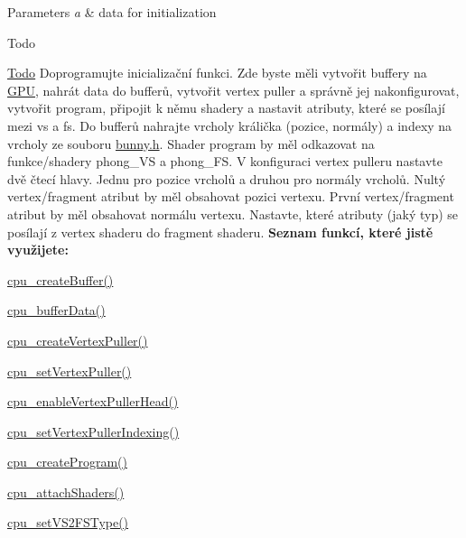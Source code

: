 \begin{DoxyParams}{Parameters}
{\em a} & data for initialization \\
\hline
\end{DoxyParams}
\begin{DoxyRefDesc}{Todo}
\item[\hyperlink{todo__todo000004}{Todo}]Doprogramujte inicializační funkci. Zde byste měli vytvořit buffery na \hyperlink{structGPU}{G\+PU}, nahrát data do bufferů, vytvořit vertex puller a správně jej nakonfigurovat, vytvořit program, připojit k němu shadery a nastavit atributy, které se posílají mezi vs a fs. Do bufferů nahrajte vrcholy králička (pozice, normály) a indexy na vrcholy ze souboru \hyperlink{bunny_8h}{bunny.\+h}. Shader program by měl odkazovat na funkce/shadery phong\+\_\+\+VS a phong\+\_\+\+FS. V konfiguraci vertex pulleru nastavte dvě čtecí hlavy. Jednu pro pozice vrcholů a druhou pro normály vrcholů. Nultý vertex/fragment atribut by měl obsahovat pozici vertexu. První vertex/fragment atribut by měl obsahovat normálu vertexu. Nastavte, které atributy (jaký typ) se posílají z vertex shaderu do fragment shaderu. {\bfseries Seznam funkcí, které jistě využijete\+:}
\begin{DoxyItemize}
\item \hyperlink{cpu_8c_a94245836b857a36f392bf86087e8e776}{cpu\+\_\+create\+Buffer()}
\item \hyperlink{cpu_8c_aee5c818b862ef2e411f121fbdfb1c634}{cpu\+\_\+buffer\+Data()}
\item \hyperlink{cpu_8c_a3ec68476772605b8be33329f88ae4d97}{cpu\+\_\+create\+Vertex\+Puller()}
\item \hyperlink{cpu_8c_a4cb243dfeb6443e0f9a6110ce1dd27eb}{cpu\+\_\+set\+Vertex\+Puller()}
\item \hyperlink{cpu_8c_a5a6ce215f054d26134c7598714cfb453}{cpu\+\_\+enable\+Vertex\+Puller\+Head()}
\item \hyperlink{cpu_8c_a4159dbbc604685e544bc296708ced5f9}{cpu\+\_\+set\+Vertex\+Puller\+Indexing()}
\item \hyperlink{cpu_8c_af3da8b71aea1c26e6a90af7da9d0e85c}{cpu\+\_\+create\+Program()}
\item \hyperlink{cpu_8c_a76c50b0e120265198fe036abdc42d271}{cpu\+\_\+attach\+Shaders()}
\item \hyperlink{cpu_8c_ae9a0898c1ebe8d914d0858f56028c591}{cpu\+\_\+set\+V\+S2\+F\+S\+Type()} 
\end{DoxyItemize}\end{DoxyRefDesc}
